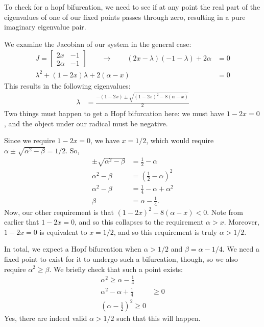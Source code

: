 \documentclass[10pt,letterpaper]{report}
\newcommand{\so}{\qquad \rightarrow \qquad}
\newcommand{\mtx}[2]{\left[\begin{array}{#1}#2\end{array}\right]}
\begin{document}
\begin{enumerate}
\begin{enumerate}
    To check for a hopf bifurcation, we need to see if at any point the real part of the eigenvalues of one of our fixed points passes through zero, resulting in a pure imaginary eigenvalue pair. 
    
    We examine the Jacobian of our system in the general case:
    \begin{align*}
    J = \mtx{cc}{2x & -1 \\ 2\alpha & -1} \so (2x - \lambda)(-1-\lambda)+2\alpha &= 0
    \\
    \lambda^2 + (1 - 2x)\lambda + 2(\alpha - x) &= 0
    \end{align*}
    This results in the following eigenvalues:
    \begin{align*}
        \lambda &= \frac{-(1-2x) \pm \sqrt{(1-2x)^2 - 8(\alpha - x)}}{2}
    \end{align*}
    Two things must happen to get a Hopf bifurcation here: we must have $1 - 2x = 0$, and the object under our radical must be negative.
    
    Since we require $1 - 2x = 0$, we have $x = 1/2$, which would require $\alpha \pm \sqrt{\alpha^2 - \beta} = 1/2$. So,
    \begin{align*}
        \pm \sqrt{\alpha^2 - \beta} &= \frac{1}{2} - \alpha
        \\
        \alpha^2 - \beta &= \left(\frac{1}{2} - \alpha\right)^2
        \\
        \alpha^2 - \beta &= \frac{1}{4} - \alpha + \alpha^2
        \\
        \beta &= \alpha - \frac{1}{4}.
    \end{align*}
    Now, our other requirement is that $(1-2x)^2 - 8(\alpha - x) < 0$. Note from earlier that $1-2x = 0$, and so this collapses to the requirement $\alpha > x$. Moreover, $1 - 2x = 0$ is equivalent to $x = 1/2$, and so this requirement is truly $\alpha > 1/2$.
    
    In total, we expect a Hopf bifurcation when $\alpha > 1/2$ and $\beta = \alpha - 1/4$. We need a fixed point to exist for it to undergo such a bifurcation, though, so we also require $\alpha^2 \geq \beta$. We briefly check that such a point exists:
    \begin{align*}
        \alpha^2 \geq \alpha - \frac 1 4 \\
        \alpha^2 - \alpha + \frac 1 4 &\geq 0 \\
        \left(\alpha - \frac{1}{2}\right)^2 \geq 0
    \end{align*}
    Yes, there are indeed valid $\alpha > 1/2$ such that this will happen.
    

\end{enumerate}
\end{enumerate}
\end{document}

